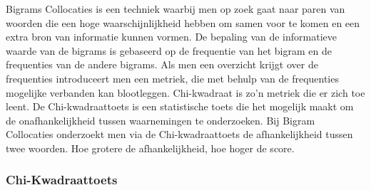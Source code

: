Bigrams Collocaties is een techniek waarbij men op zoek gaat naar paren van woorden die een hoge waarschijnlijkheid hebben om samen voor te komen en een extra bron van informatie kunnen vormen. De bepaling van de informatieve waarde van de bigrams is gebaseerd op de frequentie van het bigram en de frequenties van de andere bigrams. Als men een overzicht krijgt over de frequenties introduceert men een metriek, die met behulp van de frequenties mogelijke verbanden kan blootleggen. Chi-kwadraat is zo'n metriek die er zich toe leent. De Chi-kwadraattoets is een statistische toets die het mogelijk maakt om de onafhankelijkheid tussen waarnemingen te onderzoeken. Bij Bigram Collocaties onderzoekt men via de Chi-kwadraattoets de afhankelijkheid tussen twee woorden. Hoe grotere de afhankelijkheid, hoe hoger de score.   

\subsubsection{Chi-Kwadraattoets}\label{Chi-Kwadraattoest}


